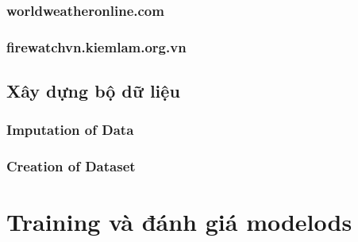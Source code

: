 \documentclass{article}
\begin{document}
\subsubsection{worldweatheronline.com}
\subsubsection{firewatchvn.kiemlam.org.vn}



\subsection{Xây dựng bộ dữ liệu}


\subsubsection{Imputation of Data}
\subsubsection{Creation of Dataset}



\section{Training và đánh giá modelods}



\end{document}
